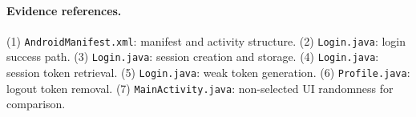 \documentclass[letterpaper,twocolumn,10pt]{article}
\begin{document}
\paragraph{Evidence references.}
(1) \texttt{AndroidManifest.xml}: manifest and activity structure.
(2) \texttt{Login.java}: login success path.
(3) \texttt{Login.java}: session creation and storage.
(4) \texttt{Login.java}: session token retrieval.
(5) \texttt{Login.java}: weak token generation.
(6) \texttt{Profile.java}: logout token removal.
(7) \texttt{MainActivity.java}: non-selected UI randomness for comparison.
\end{document}
